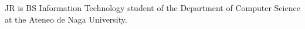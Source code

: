 \begin{vita}
JR is BS Information Technology student of the
Department of Computer Science at the Ateneo de Naga University.
\end{vita}

